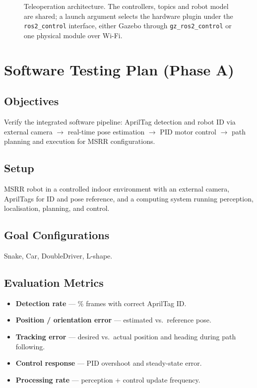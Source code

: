 \documentclass[12pt,a4paper]{article}
\begin{document}
\begin{figure}[p]
{%
}
\caption{Teleoperation architecture. The controllers, topics and robot model are shared;
a launch argument selects the hardware plugin under the \texttt{ros2\_control} interface,
either Gazebo through \texttt{gz\_ros2\_control} or one physical module over Wi-Fi.}
\label{fig:teleop-architecture}
\end{figure}

\clearpage
\section{Software Testing Plan (Phase A)}
\label{sec:software-testing}

\subsection{Objectives}

Verify the integrated software pipeline: AprilTag detection and robot ID via external camera $\rightarrow$ real-time pose estimation $\rightarrow$ PID motor control $\rightarrow$ path planning and execution for MSRR configurations.

\subsection{Setup}

MSRR robot in a controlled indoor environment with an external camera, AprilTags for ID and pose reference, and a computing system running perception, localisation, planning, and control.

\subsection{Goal Configurations}

Snake, Car, DoubleDriver, L-shape.

\subsection{Evaluation Metrics}

\begin{itemize}
\item \textbf{Detection rate} --- \% frames with correct AprilTag ID.
\item \textbf{Position / orientation error} --- estimated vs.\ reference pose.
\item \textbf{Tracking error} --- desired vs.\ actual position and heading during path following.
\item \textbf{Control response} --- PID overshoot and steady-state error.
\item \textbf{Processing rate} --- perception + control update frequency.
\end{itemize}
\end{document}
